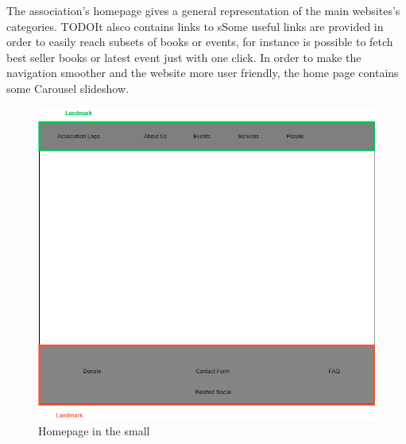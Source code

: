 The association's homepage gives a general representation of the main websites's categories.  TODOIt alsco contains links to sSome useful links are provided in order to easily reach subsets of
books or events, for instance is possible to fetch best seller books or latest event
just with one click. In order to make the navigation smoother and the website more
user friendly, the home page contains some Carousel slideshow.

\begin{figure}[h!]
	\centering
	\begin{minipage}[b]{1\textwidth}
    		\includegraphics[width=\textwidth]{./assets/homepage.png}
		\caption{Homepage in the small}
	\end{minipage}
\end{figure}
\FloatBarrier


